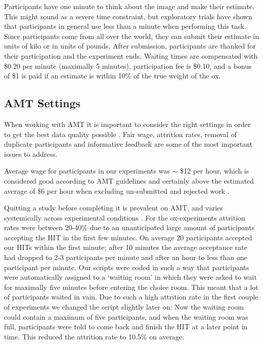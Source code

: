 \documentclass[9pt,twoside,lineno]{pnas-new}
\begin{document}
Participants have one minute to think about the image and make their estimate. This might sound as a severe time constraint, but exploratory trials have shown that participants in general use less than a minute when performing this task. Since participants come from all over the world, they can submit their estimate in units of kilo or in units of pounds. After submission, participants are thanked for their participation and the experiment ends. Waiting times are compensated with \$0.20 per minute (maximally 5 minutes), participation fee is \$0.10, and a bonus of \$1 is paid if an estimate is within 10\% of the true weight of the ox.

\subsection*{AMT Settings}
When working with AMT it is important to consider the right settings in order to get the best data quality possible \cite{chandler2016conducting}. Fair wage, attrition rates, removal of duplicate participants and informative feedback are some of the most important issues to address.

Average wage for participants in our experiments was $\sim$ \$12 per hour, which is considered good according to AMT guidelines and certainly above the estimated average of \$6 per hour when excluding un-submitted and rejected work \cite{hara2018data}.

Quitting a study before completing it is prevalent on AMT, and varies systemically across experimental conditions \cite{zhou2016pitfall}. For the ox-experiments attrition rates were between 20-40\% due to an unanticipated large amount of participants accepting the HIT in the first few minutes. On average 20 participants accepted our HITs within the first minute; after 10 minutes the average acceptance rate had dropped to 2-3 participants per minute and after an hour to less than one participant per minute. Our scripts were coded in such a way that participants were automatically assigned to a ‘waiting room’ in which they were asked to wait for maximally five minutes before entering the choice room. This meant that a lot of participants waited in vain. Due to such a high attrition rate in the first couple of experiments we changed the script slightly later on: Now the waiting room could contain a maximum of five participants, and when the waiting room was full, participants were told to come back and finish the HIT at a later point in time. This reduced the attrition rate to 10.5\% on average.
\end{document}
